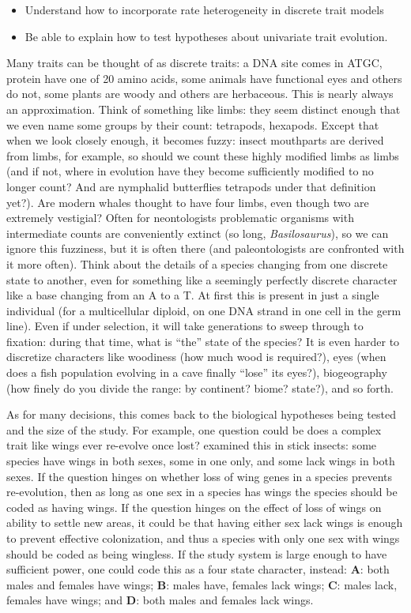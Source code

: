 \documentclass[]{book}
\providecommand{\tightlist}{%
  \setlength{\itemsep}{0pt}\setlength{\parskip}{0pt}}
\theoremstyle{definition}
\theoremstyle{definition}
\theoremstyle{remark}
\begin{document}
\begin{itemize}
\tightlist
\item
  Understand how to incorporate rate heterogeneity in discrete trait
  models
\item
  Be able to explain how to test hypotheses about univariate trait
  evolution.
\end{itemize}

Many traits can be thought of as discrete traits: a DNA site comes in
ATGC, protein have one of 20 amino acids, some animals have functional
eyes and others do not, some plants are woody and others are herbaceous.
This is nearly always an approximation. Think of something like limbs:
they seem distinct enough that we even name some groups by their count:
tetrapods, hexapods. Except that when we look closely enough, it becomes
fuzzy: insect mouthparts are derived from limbs, for example, so should
we count these highly modified limbs as limbs (and if not, where in
evolution have they become sufficiently modified to no longer count? And
are nymphalid butterflies tetrapods under that definition yet?). Are
modern whales thought to have four limbs, even though two are extremely
vestigial? Often for neontologists problematic organisms with
intermediate counts are conveniently extinct (so long,
\emph{Basilosaurus}), so we can ignore this fuzziness, but it is often
there (and paleontologists are confronted with it more often). Think
about the details of a species changing from one discrete state to
another, even for something like a seemingly perfectly discrete
character like a base changing from an A to a T. At first this is
present in just a single individual (for a multicellular diploid, on one
DNA strand in one cell in the germ line). Even if under selection, it
will take generations to sweep through to fixation: during that time,
what is ``the'' state of the species? It is even harder to discretize
characters like woodiness (how much wood is required?), eyes (when does
a fish population evolving in a cave finally ``lose'' its eyes?),
biogeography (how finely do you divide the range: by continent? biome?
state?), and so forth.

As for many decisions, this comes back to the biological hypotheses
being tested and the size of the study. For example, one question could
be does a complex trait like wings ever re-evolve once lost?
\citet{Whiting2003} examined this in stick insects: some species have
wings in both sexes, some in one only, and some lack wings in both
sexes. If the question hinges on whether loss of wing genes in a species
prevents re-evolution, then as long as one sex in a species has wings
the species should be coded as having wings. If the question hinges on
the effect of loss of wings on ability to settle new areas, it could be
that having either sex lack wings is enough to prevent effective
colonization, and thus a species with only one sex with wings should be
coded as being wingless. If the study system is large enough to have
sufficient power, one could code this as a four state character,
instead: \textbf{A}: both males and females have wings; \textbf{B}:
males have, females lack wings; \textbf{C}: males lack, females have
wings; and \textbf{D}: both males and females lack wings.
\end{document}
